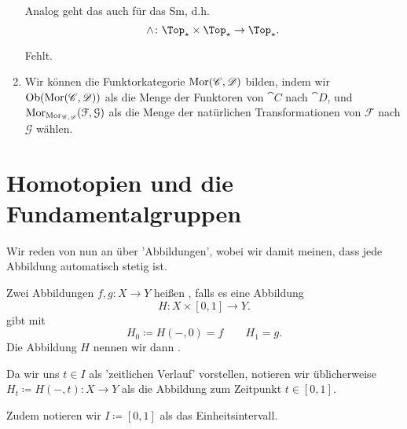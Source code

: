 \begin{example}
\begin{enumerate}[1)]
    Analog geht das auch für das Sm, d.h. 
    \[
    \tsmash\colon  \Top_{\star} \times \Top_{\star} \to  \Top_{\star}
    .\] 
    \begin{example}
        Fehlt.
    \end{example}
\item Wir können die Funktorkategorie $\operatorname{Mor}(\mathscr{C},\mathscr{D})$ bilden, indem wir $\operatorname{Ob}(\operatorname{Mor}(\mathscr{C},\mathscr{D}))$ als die Menge der Funktoren von $\cat{C}$ nach $\cat{D}$, und $\operatorname{Mor}_{\operatorname{Mor}_{\mathscr{C},\mathscr{D}}}(\mathcal{F},\mathcal{G})$ als die Menge der natürlichen Transformationen von $\mathcal{F}$ nach $\mathcal{G}$ wählen.
    \end{enumerate}
\end{example}


\section{Homotopien und die Fundamentalgruppen}
\begin{oral}
    Wir reden von nun an über 'Abbildungen', wobei wir damit meinen, dass jede Abbildung automatisch stetig ist.
\end{oral}

\begin{definition}[Homotopie]\label{def:homotop}
    Zwei Abbildungen $f,g\colon  X \to  Y$ heißen , falls es eine Abbildung
    \[
        H \colon  X \times [0,1] \to  Y
    .\] 
    gibt mit 
    \[
        H_0 \coloneqq  H(-,0) = f \qquad H_1 = g
    .\] 
    Die Abbildung $H$ nennen wir dann  . 
\end{definition}

\begin{dnotation}
    Da wir uns $t\in I$ als 'zeitlichen Verlauf' vorstellen, notieren wir üblicherweise $H_t \coloneqq  H(-,t)\colon  X \to  Y$ als die Abbildung zum Zeitpunkt $t\in [0,1]$. 

    Zudem notieren wir $I \coloneqq  [0,1]$ als das Einheitsintervall.
\end{dnotation}

